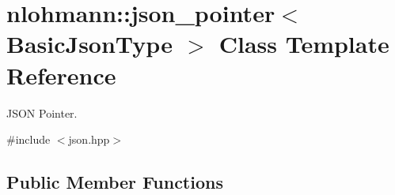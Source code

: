 \hypertarget{classnlohmann_1_1json__pointer}{}\section{nlohmann\+:\+:json\+\_\+pointer$<$ Basic\+Json\+Type $>$ Class Template Reference}
\label{classnlohmann_1_1json__pointer}


J\+S\+ON Pointer.  




{\ttfamily \#include $<$json.\+hpp$>$}

\subsection*{Public Member Functions}
